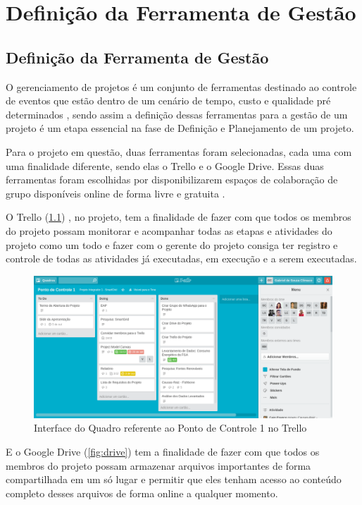 \part{Definição da Ferramenta de Gestão}
\chapter[Definição da Ferramenta de Gestão]{Definição da Ferramenta de Gestão}

O gerenciamento de projetos é um conjunto de ferramentas destinado ao controle de eventos que estão dentro de um cenário de tempo, custo e qualidade pré determinados \cite{vargas2016gerenciamento}, sendo assim a definição dessas ferramentas para a gestão de um projeto é um etapa essencial na fase de Definição e Planejamento de um projeto.  

Para o projeto em questão, duas ferramentas foram selecionadas, cada uma com uma finalidade diferente, sendo elas o Trello e o Google Drive. Essas duas ferramentas foram escolhidas por disponibilizarem espaços de colaboração de grupo disponíveis online de forma livre e gratuita \cite{paulus2013digital}. 

O Trello (\ref{fig:trello}) , no projeto, tem a finalidade de fazer com que todos os membros do projeto possam monitorar e acompanhar todas as etapas e atividades do projeto como um todo e fazer com o gerente do projeto consiga ter registro e controle de todas as atividades já executadas, em execução e a serem executadas.

\begin{figure}[!h]
	\centering
	\includegraphics[scale=.7]{figuras/trello.png}
	\caption{Interface do Quadro referente ao Ponto de Controle 1 no Trello}
	\label{fig:trello}
\end{figure}

E o Google Drive (\ref{fig:drive}) tem a finalidade de fazer com que todos os membros do projeto possam armazenar arquivos importantes de forma compartilhada em um só lugar e permitir que eles tenham acesso ao conteúdo completo desses arquivos de forma online a qualquer momento.


